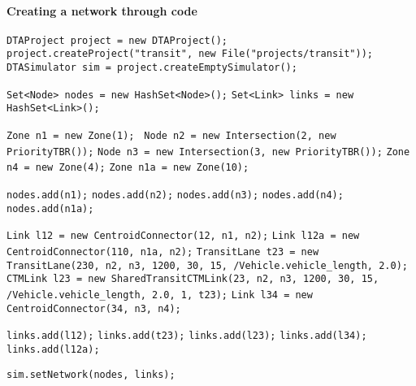 \paragraph*{Creating a network through code}
\begin{algorithmic}[1]
\State\texttt{DTAProject project = new DTAProject();}
\State\texttt{project.createProject("transit", new File("projects/transit"));}
\State\texttt{DTASimulator sim = project.createEmptySimulator();\linebreak }
        
\State\texttt{Set<Node> nodes = new HashSet<Node>();}
\State\texttt{Set<Link> links = new HashSet<Link>();\linebreak }
        
        
\State\texttt{Zone n1 = new Zone(1);}
\State\texttt{ Node n2 = new Intersection(2, new PriorityTBR());}
\State\texttt{Node n3 = new Intersection(3, new PriorityTBR());}
\State\texttt{Zone n4 = new Zone(4);}
\State\texttt{Zone n1a = new Zone(10);\linebreak }
        
\State\texttt{nodes.add(n1);}
\State\texttt{nodes.add(n2);}
\State\texttt{nodes.add(n3);}
\State\texttt{nodes.add(n4);}
\State\texttt{nodes.add(n1a);\linebreak }
        
\State\texttt{Link l12 = new CentroidConnector(12, n1, n2);}
\State\texttt{Link l12a = new CentroidConnector(110, n1a, n2);}
\State\texttt{TransitLane t23 = new TransitLane(230, n2, n3, 1200, 30, 15, /Vehicle.vehicle\_length, 2.0);}
\State\texttt{CTMLink l23 = new SharedTransitCTMLink(23, n2, n3, 1200, 30, 15, /Vehicle.vehicle\_length, 2.0, 1, t23);}
\State\texttt{Link l34 = new CentroidConnector(34, n3, n4);\linebreak }
        
\State\texttt{links.add(l12);}
\State\texttt{links.add(t23);}
\State\texttt{links.add(l23);}
\State\texttt{links.add(l34);}
\State\texttt{links.add(l12a);\linebreak }
        
\State\texttt{sim.setNetwork(nodes, links);}
\end{algorithmic}